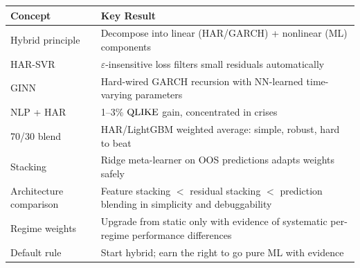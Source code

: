 \begin{keyresult}
\centering
\begin{tabular}{p{4.5cm}p{8.5cm}}
\toprule
\textbf{Concept} & \textbf{Key Result} \\
\midrule
Hybrid principle
  & Decompose into linear (HAR/GARCH) + nonlinear (ML) components \\
HAR-SVR
  & $\varepsilon$-insensitive loss filters small residuals automatically \\
GINN
  & Hard-wired GARCH recursion with NN-learned time-varying
    parameters~\citep{GINN2024} \\
NLP + HAR
  & 1--3\% $\operatorname{QLIKE}$ gain, concentrated in
    crises~\citep{RahimikiaZohrenPoon2021NLP} \\
70/30 blend
  & HAR/LightGBM weighted average: simple, robust, hard to beat \\
Stacking
  & Ridge meta-learner on OOS predictions adapts weights safely \\
Architecture comparison
  & Feature stacking $<$ residual stacking $<$ prediction blending
    in simplicity and debuggability \\
Regime weights
  & Upgrade from static only with evidence of systematic per-regime
    performance differences \\
Default rule
  & Start hybrid; earn the right to go pure ML with evidence \\
\bottomrule
\end{tabular}
\end{keyresult}
